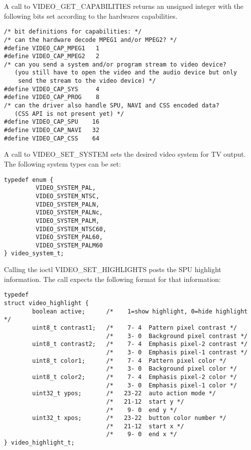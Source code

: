 \label{videocaps}
A call to VIDEO\_GET\_CAPABILITIES returns an unsigned integer with
the following bits set according to the hardwares capabilities.
\begin{verbatim}
/* bit definitions for capabilities: */
/* can the hardware decode MPEG1 and/or MPEG2? */
#define VIDEO_CAP_MPEG1   1 
#define VIDEO_CAP_MPEG2   2
/* can you send a system and/or program stream to video device?
   (you still have to open the video and the audio device but only 
    send the stream to the video device) */
#define VIDEO_CAP_SYS     4
#define VIDEO_CAP_PROG    8
/* can the driver also handle SPU, NAVI and CSS encoded data? 
   (CSS API is not present yet) */
#define VIDEO_CAP_SPU    16
#define VIDEO_CAP_NAVI   32
#define VIDEO_CAP_CSS    64
\end{verbatim}


\label{videosys}
A call to VIDEO\_SET\_SYSTEM sets the desired video system for TV
output. The following  system types can be set:

\begin{verbatim}
typedef enum {
         VIDEO_SYSTEM_PAL, 
         VIDEO_SYSTEM_NTSC, 
         VIDEO_SYSTEM_PALN, 
         VIDEO_SYSTEM_PALNc, 
         VIDEO_SYSTEM_PALM, 
         VIDEO_SYSTEM_NTSC60, 
         VIDEO_SYSTEM_PAL60,
         VIDEO_SYSTEM_PALM60
} video_system_t;
\end{verbatim}



\label{vhilite}
Calling the ioctl VIDEO\_SET\_HIGHLIGHTS posts the SPU highlight
information. The call expects the following format for that information:

\begin{verbatim}
typedef 
struct video_highlight {
        boolean active;      /*    1=show highlight, 0=hide highlight */
        uint8_t contrast1;   /*    7- 4  Pattern pixel contrast */
                             /*    3- 0  Background pixel contrast */
        uint8_t contrast2;   /*    7- 4  Emphasis pixel-2 contrast */
                             /*    3- 0  Emphasis pixel-1 contrast */
        uint8_t color1;      /*    7- 4  Pattern pixel color */
                             /*    3- 0  Background pixel color */
        uint8_t color2;      /*    7- 4  Emphasis pixel-2 color */
                             /*    3- 0  Emphasis pixel-1 color */
        uint32_t ypos;       /*   23-22  auto action mode */
                             /*   21-12  start y */
                             /*    9- 0  end y */
        uint32_t xpos;       /*   23-22  button color number */
                             /*   21-12  start x */
                             /*    9- 0  end x */
} video_highlight_t;
\end{verbatim}


